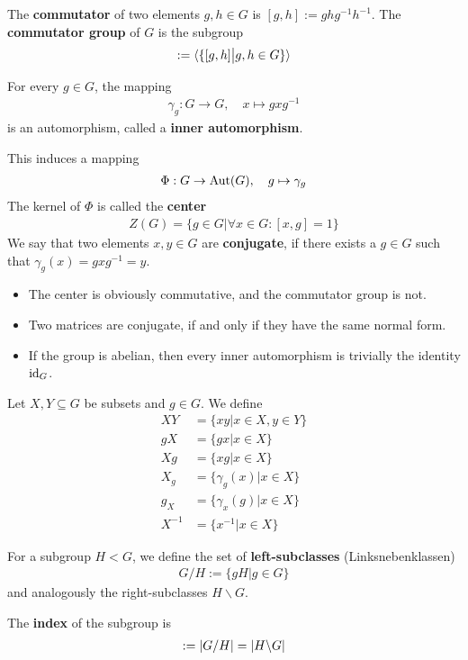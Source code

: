 \begin{dfn}
  The \textbf{commutator} of two elements $g,h \in G$ is $[g,h] := gh g^{-1} h^{-1}$.
  The \textbf{commutator group} of $G$ is the subgroup
  \begin{align*}
    [G,G] := \scal{\{[g,h] \big\vert g,h \in G\}}
  \end{align*}
\end{dfn}

\begin{dfn}
  For every $g \in G$, the mapping
  \begin{align*}
    \gamma_g: G \to G, \quad x \mapsto gxg^{-1}
  \end{align*}
  is an automorphism, called a \textbf{inner automorphism}.

  This induces a mapping
  \begin{align*}
    \Phi: G \to \operatorname{Aut}(G), \quad g \mapsto \gamma_g
  \end{align*}
  The kernel of $\Phi$ is called the \textbf{center}
  \begin{align*}
    Z(G) = \{g \in G \big\vert \forall x \in G: [x,g] = 1\}
  \end{align*}
  We say that two elements $x,y \in G$ are \textbf{conjugate}, if there exists a $g \in G$ such that $\gamma_g(x) = gxg^{-1} = y$.
\end{dfn}

\begin{itemize}
  \item The center is obviously commutative, and the commutator group is not.
  \item Two matrices are conjugate, if and only if they have the same normal form.
  \item If the group is abelian, then every inner automorphism is trivially the identity $\operatorname{id}_G$.
\end{itemize}

\begin{dfn}[]
  Let $X,Y \subseteq G$ be subsets and $g \in G$. We define
  \begin{align*}
    X Y &= \{xy \big\vert x \in X,y \in Y\}\\
    gX &= \{gx \big\vert x \in X\}\\
    Xg &= \{xg \big\vert x \in X\}\\
    X_g &= \{\gamma_g(x) \big\vert x \in X\}\\
    g_X &= \{\gamma_x(g) \big\vert x \in X\}\\
    X^{-1}&= \{x^{-1} \big\vert x \in X\}
  \end{align*}

  For a subgroup $H < G$, we define the set of \textbf{left-subclasses} (Linksnebenklassen)
  \begin{align*}
    G/H := \{gH \big\vert g \in G\} 
  \end{align*}
  and analogously the right-subclasses $H \backslash G$.

  The \textbf{index} of the subgroup is
  \begin{align*}
    [G:H] := \abs{G/H} = \abs{H \backslash G}
  \end{align*}
\end{dfn}

